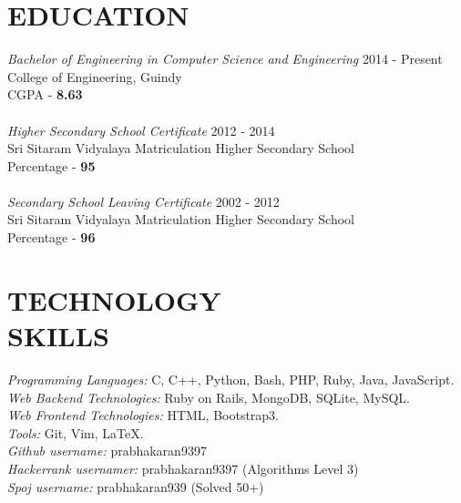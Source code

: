 \documentclass[margin, 10pt]{res} %
\begin{document}
\begin{resume}

 


\section{EDUCATION}

{\sl Bachelor of Engineering in Computer Science and Engineering}  \hfill 2014 - Present \\
College of Engineering, Guindy\\
{CGPA - \textbf{8.63}} \\ 
\\
{\sl Higher Secondary School Certificate}  \hfill 2012 - 2014 \\
Sri Sitaram Vidyalaya Matriculation Higher Secondary School\\ 
{Percentage - \textbf{95}} \\
\\
{\sl Secondary School Leaving Certificate}  \hfill 2002 - 2012 \\
Sri Sitaram Vidyalaya Matriculation Higher Secondary School\\ 
{Percentage - \textbf{96}}
 


\section{TECHNOLOGY \\ SKILLS} 

{\sl Programming Languages:} C, C++, Python, Bash, PHP, Ruby, Java, JavaScript. \\
{\sl Web Backend Technologies:} Ruby on Rails, MongoDB, SQLite, MySQL. \\
{\sl Web Frontend Technologies:} HTML, Bootstrap3. \\
{\sl Tools:} Git, Vim, LaTeX. \\
{\sl Github username:} prabhakaran9397 \\
{\sl Hackerrank usernamer:} prabhakaran9397 (Algorithms Level 3) \\
{\sl Spoj username:} prabhakaran939 (Solved 50+) \\
 

\end{resume}
\end{document}
